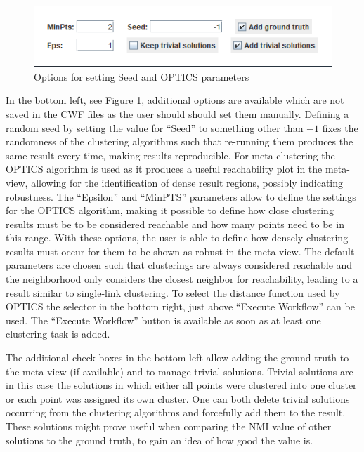 \documentclass[
	a4paper,
	english,
	twoside,
	openright,               
	11pt                            
	]{report}
\begin{document}
\begin{figure}[h]
	\centering
	\includegraphics[scale=.65]{workflow-options}
	\caption{Options for setting Seed and OPTICS parameters}
	\label{fig:workflow-options}
\end{figure}

In the bottom left, see Figure \ref{fig:workflow-options}, additional options are available which are not saved in the CWF files as the user should should set them manually. Defining a random seed by setting the value for ``Seed'' to something other than $-1$ fixes the randomness of the clustering algorithms such that re-running them produces the same result every time, making results reproducible. For meta-clustering the OPTICS \cite{10.1145/304181.304187} algorithm is used as it produces a useful reachability plot in the meta-view, allowing for the identification of dense result regions, possibly indicating robustness. The ``Epsilon'' and ``MinPTS'' parameters allow to define the settings for the OPTICS algorithm, making it possible to define how close clustering results must be to be considered reachable and how many points need to be in this range. With these options, the user is able to define how densely clustering results must occur for them to be shown as robust in the meta-view. The default parameters are chosen such that clusterings are always considered reachable and the neighborhood only considers the closest neighbor for reachability, leading to a result similar to single-link clustering. To select the distance function used by OPTICS the selector in the bottom right, just above ``Execute Workflow'' can be used. The ``Execute Workflow'' button is available as soon as at least one clustering task is added.

The additional check boxes in the bottom left allow adding the ground truth to the meta-view (if available) and to manage trivial solutions. Trivial solutions are in this case the solutions in which either all points were clustered into one cluster or each point was assigned its own cluster. One can both delete trivial solutions occurring from the clustering algorithms and forcefully add them to the result. These solutions might prove useful when comparing the NMI value of other solutions to the ground truth, to gain an idea of how good the value is.
\end{document}
